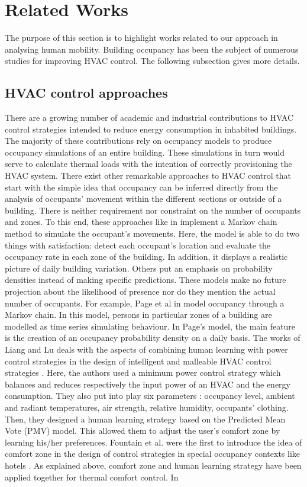 \section{Related Works}
\label{sec:relatedworks}

The purpose of this section is to highlight works related to our approach in analysing human mobility. Building occupancy has been the subject of numerous studies for improving HVAC control. The following subsection gives more details.

\subsection{ HVAC control approaches}
There are a growing number of academic and industrial contributions to HVAC control strategies intended to reduce energy consumption in inhabited buildings. The majority of these contributions rely on occupancy models to produce occupancy simulations of an entire building. These simulations in turn would serve to calculate thermal loads with the intention of correctly provisioning the  HVAC system. There exist other remarkable approaches to HVAC control that start with the simple idea that occupancy can be inferred directly from the analysis of occupants’ movement within the different sections or outside of a building. There is neither requirement nor constraint on the number of occupants and zones. To this end, these approaches like in \cite{buildingoccupancyusingmarkov} implement a Markov chain method to simulate the occupant's movements. Here, the model is able to do two things with satisfaction: detect each occupant’s location and evaluate the occupancy rate in each zone of the building. In addition, it displays a realistic picture of daily building variation. Others put an emphasis on probability densities instead of making specific predictions. These models make no future projection about the likelihood of presence nor do they mention the actual number of occupants. For example, Page et al in \cite{stochasticsimulation}  model occupancy through a Markov chain. In this model, persons in particular zones of a building are modelled as time series simulating behaviour. In Page’s model, the main feature is the creation of an occupancy probability density on a daily basis.   The works of Liang and Lu deals with the aspects of combining human learning with power control strategies in the design of intelligent and malleable HVAC control strategies \cite{Designofintelligentcomfort}. Here, the authors used a minimum power control strategy which balances and reduces respectively the input power of an HVAC and the energy consumption. They also put into play six parameters : occupancy level, ambient and radiant temperatures, air strength, relative humidity, occupants’ clothing. Then, they designed a human learning strategy based on the Predicted Mean Vote (PMV) model. This allowed them to adjust the user’s comfort zone by learning his/her preferences. Fountain et al. were the first to introduce the idea of comfort zone in the design of control strategies in special occupancy contexts like hotels \cite{Comfortcontrol}. As explained above, comfort zone and human learning strategy have been applied together for thermal comfort control. In 